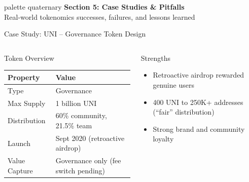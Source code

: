 \documentclass[8pt,aspectratio=169]{beamer}
\begin{document}
\begin{frame}{}
\begin{beamercolorbox}[sep=12pt,center,rounded=true,shadow=true]{palette quaternary}
{\Large\bfseries Section 5: Case Studies \& Pitfalls}\\[6pt]
{\normalsize Real-world tokenomics successes, failures, and lessons learned}
\end{beamercolorbox}
\end{frame}

\begin{frame}{Case Study: UNI -- Governance Token Design}
\begin{columns}[T]
\begin{block}{Token Overview}
\footnotesize
\begin{tabular}{ll}
\toprule
\textbf{Property} & \textbf{Value} \\
\midrule
Type & Governance \\
Max Supply & 1 billion UNI \\
Distribution & 60\% community, 21.5\% team \\
Launch & Sept 2020 (retroactive airdrop) \\
Value Capture & Governance only (fee switch pending) \\
\bottomrule
\end{tabular}
\end{block}
\vspace{2mm}
\begin{exampleblock}{\footnotesize Strengths}
\footnotesize
\begin{itemize}
  \item Retroactive airdrop rewarded genuine users
  \item 400 UNI to 250K+ addresses (``fair'' distribution)
  \item Strong brand and community loyalty
\end{itemize}
\end{exampleblock}


\end{columns}
\end{frame}
\end{document}
